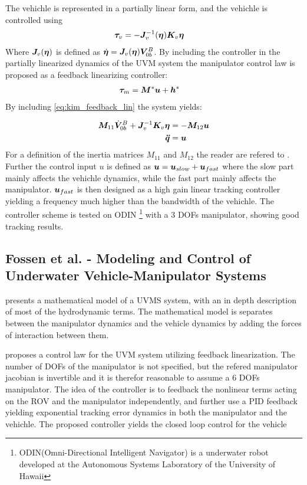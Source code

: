The vehichle is represented in a partially linear form, and the vehichle is controlled using
\begin{align}
  \boldsymbol \tau_v &= - \boldsymbol J_{v}^{-1}(\boldsymbol \eta)\boldsymbol K_v \boldsymbol \eta
  \label{eq:kimProp}
\end{align}
Where $\boldsymbol J_v(\boldsymbol \eta)$ is defined as $\dot{\boldsymbol \eta}=\boldsymbol J_v(\boldsymbol \eta)\boldsymbol V_{0b}^B $. By including the controller in the partially linearized dynamics of the UVM system the manipulator control law is proposed as a feedback linearizing controller:
\begin{align}
  \boldsymbol \tau_m &=\boldsymbol M^* \boldsymbol u+ \boldsymbol h^*
  \label{eq:kim_feedback_lin}
\end{align}
By including \eqref{eq:kim_feedback_lin} the system yields:

\begin{align}
  \boldsymbol M_{11}  \dot{\boldsymbol V}_{0b}^B + \boldsymbol J_v^{-1} \boldsymbol K_v \boldsymbol \eta &= -\boldsymbol M_{12} \boldsymbol u
  \label{eq:kim_linearized} \\
  \boldsymbol{\ddot q} &=\boldsymbol u
  \label{eq_kim_linearized2}
\end{align}
For a definition of the inertia matrices $M_{11}$ and $M_{12}$ the reader are refered to \cite{two_time_scale}. Further the control input $u$ is defined as $\boldsymbol u = \boldsymbol u_{slow}+\boldsymbol u_{fast}$ where the slow part mainly affects the vehichle dynamics, while the fast part mainly affects the manipulator. $\boldsymbol u_{fast}$ is then designed as a high gain linear tracking controller yielding a frequency much higher than the bandwidth of the vehichle. The controller scheme is tested on ODIN \footnote{ODIN(Omni-Directional Intelligent Navigator) is a underwater robot developed at the Autonomous Systems Laboratory of the University of Hawaii} with a 3 DOFs manipulator, showing good tracking results.  


\subsection{Fossen et al. - Modeling and Control of Underwater Vehicle-Manipulator Systems }

\cite{foss_schjolberg_modelling} presents a mathematical model of a UVMS system, with an in depth description of most of the hydrodynamic terms. The mathematical model is separates between the manipulator dynamics and the vehicle dynamics by adding the forces of interaction between them.

proposes a control law for the UVM system utilizing feedback linearization. The number of DOFs of the manipulator is not specified, but the refered manipulator jacobian is invertible and it is therefor reasonable to assume a 6 DOFs manipulator. The idea of the controller is to feedback the nonlinear terms acting on the ROV and the manipulator independently, and further use a PID feedback yielding exponential tracking error dynamics in both the manipulator and the vehichle. The proposed controller yields the closed loop control for the vehicle

